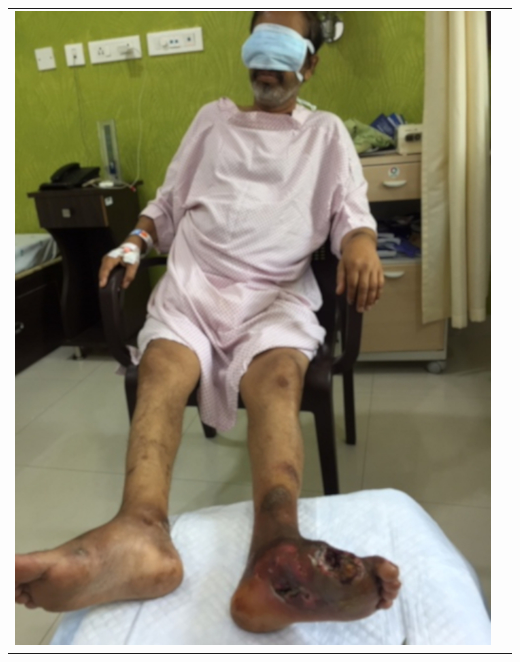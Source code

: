 \begin{center}
\begin{tabular}{@{}cc@{}}
\includegraphics[scale=.9]{images/068.jpg} &

\end{tabular}
\end{center}
